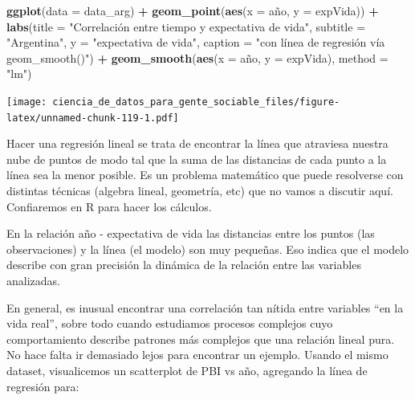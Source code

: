 \documentclass[]{book}
\newenvironment{Shaded}{\begin{snugshade}}{\end{snugshade}}
\newcommand{\KeywordTok}[1]{\textcolor[rgb]{0.13,0.29,0.53}{\textbf{#1}}}
\newcommand{\DataTypeTok}[1]{\textcolor[rgb]{0.13,0.29,0.53}{#1}}
\newcommand{\StringTok}[1]{\textcolor[rgb]{0.31,0.60,0.02}{#1}}
\newcommand{\OperatorTok}[1]{\textcolor[rgb]{0.81,0.36,0.00}{\textbf{#1}}}
\newcommand{\NormalTok}[1]{#1}
\begin{document}
\begin{Shaded}
\begin{Highlighting}[]
\KeywordTok{ggplot}\NormalTok{(}\DataTypeTok{data =}\NormalTok{ data_arg) }\OperatorTok{+}\StringTok{ }
\StringTok{    }\KeywordTok{geom_point}\NormalTok{(}\KeywordTok{aes}\NormalTok{(}\DataTypeTok{x =}\NormalTok{ año, }\DataTypeTok{y =}\NormalTok{ expVida)) }\OperatorTok{+}
\StringTok{    }\KeywordTok{labs}\NormalTok{(}\DataTypeTok{title =} \StringTok{"Correlación entre tiempo y expectativa de vida"}\NormalTok{,}
         \DataTypeTok{subtitle =} \StringTok{"Argentina"}\NormalTok{,}
         \DataTypeTok{y =} \StringTok{"expectativa de vida"}\NormalTok{,}
         \DataTypeTok{caption =} \StringTok{"con línea de regresión vía geom_smooth()"}\NormalTok{) }\OperatorTok{+}
\StringTok{    }\KeywordTok{geom_smooth}\NormalTok{(}\KeywordTok{aes}\NormalTok{(}\DataTypeTok{x =}\NormalTok{ año, }\DataTypeTok{y =}\NormalTok{ expVida), }\DataTypeTok{method =} \StringTok{"lm"}\NormalTok{)}
\end{Highlighting}
\end{Shaded}

\texttt{[image: ciencia\_de\_datos\_para\_gente\_sociable\_files/figure-latex/unnamed-chunk-119-1.pdf]}

Hacer una regresión lineal se trata de encontrar la línea que atraviesa
nuestra nube de puntos de modo tal que la suma de las distancias de cada
punto a la línea sea la menor posible. Es un problema matemático que
puede resolverse con distintas técnicas (algebra lineal, geometría, etc)
que no vamos a discutir aquí. Confiaremos en R para hacer los cálculos.

En la relación año - expectativa de vida las distancias entre los puntos
(las observaciones) y la línea (el modelo) son muy pequeñas. Eso indica
que el modelo describe con gran precisión la dinámica de la relación
entre las variables analizadas.

En general, es inusual encontrar una correlación tan nítida entre
variables ``en la vida real'', sobre todo cuando estudiamos procesos
complejos cuyo comportamiento describe patrones más complejos que una
relación lineal pura. No hace falta ir demasiado lejos para encontrar un
ejemplo. Usando el mismo dataset, visualicemos un scatterplot de PBI vs
año, agregando la línea de regresión para:
\end{document}
